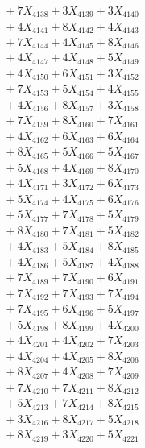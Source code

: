 \documentclass[a4paper,10pt]{article}
\begin{document}
{\begin{align}
&\;  + 7 X_{4138} + 3 X_{4139} + 3 X_{4140} \\[0.3ex]
&\;  + 4 X_{4141} + 8 X_{4142} + 4 X_{4143} \\[0.3ex]
&\;  + 7 X_{4144} + 4 X_{4145} + 8 X_{4146} \\[0.3ex]
&\;  + 4 X_{4147} + 4 X_{4148} + 5 X_{4149} \\[0.5ex]\allowbreak
&\;  + 4 X_{4150} + 6 X_{4151} + 3 X_{4152} \\[0.3ex]
&\;  + 7 X_{4153} + 5 X_{4154} + 4 X_{4155} \\[0.3ex]
&\;  + 4 X_{4156} + 8 X_{4157} + 3 X_{4158} \\[0.3ex]
&\;  + 7 X_{4159} + 8 X_{4160} + 7 X_{4161} \\[0.3ex]
&\;  + 4 X_{4162} + 6 X_{4163} + 6 X_{4164} \\[0.3ex]
&\;  + 8 X_{4165} + 5 X_{4166} + 5 X_{4167} \\[0.3ex]
&\;  + 5 X_{4168} + 4 X_{4169} + 8 X_{4170} \\[0.3ex]
&\;  + 4 X_{4171} + 3 X_{4172} + 6 X_{4173} \\[0.3ex]
&\;  + 5 X_{4174} + 4 X_{4175} + 6 X_{4176} \\[0.3ex]
&\;  + 5 X_{4177} + 7 X_{4178} + 5 X_{4179} \\[0.5ex]\allowbreak
&\;  + 8 X_{4180} + 7 X_{4181} + 5 X_{4182} \\[0.3ex]
&\;  + 4 X_{4183} + 5 X_{4184} + 8 X_{4185} \\[0.3ex]
&\;  + 4 X_{4186} + 5 X_{4187} + 4 X_{4188} \\[0.3ex]
&\;  + 7 X_{4189} + 7 X_{4190} + 6 X_{4191} \\[0.3ex]
&\;  + 7 X_{4192} + 7 X_{4193} + 7 X_{4194} \\[0.3ex]
&\;  + 7 X_{4195} + 6 X_{4196} + 5 X_{4197} \\[0.3ex]
&\;  + 5 X_{4198} + 8 X_{4199} + 4 X_{4200} \\[0.3ex]
&\;  + 4 X_{4201} + 4 X_{4202} + 7 X_{4203} \\[0.3ex]
&\;  + 4 X_{4204} + 4 X_{4205} + 8 X_{4206} \\[0.3ex]
&\;  + 8 X_{4207} + 4 X_{4208} + 7 X_{4209} \\[0.5ex]\allowbreak
&\;  + 7 X_{4210} + 7 X_{4211} + 8 X_{4212} \\[0.3ex]
&\;  + 5 X_{4213} + 7 X_{4214} + 8 X_{4215} \\[0.3ex]
&\;  + 3 X_{4216} + 8 X_{4217} + 5 X_{4218} \\[0.3ex]
&\;  + 8 X_{4219} + 3 X_{4220} + 5 X_{4221} \\[0.3ex]

\end{align}}
\end{document}
